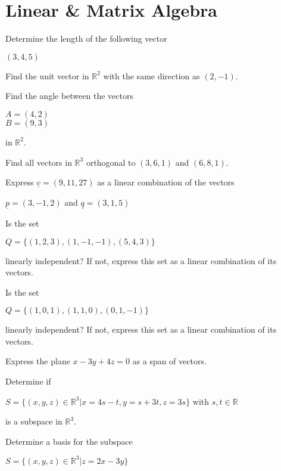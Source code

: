 \documentclass[12pt]{exam}
\begin{document}
\section{Linear \& Matrix Algebra}

\begin{questions}

\question Determine the length of the following vector

\begin{center}
    $(3,4,5)$
\end{center}

\question Find the unit vector in $\mathbb{R}^{2}$ with the same direction as $(2,-1)$.

\question Find the angle between the vectors
\begin{center}
    $A = (4,2)$ \\ $B = (9,3)$
\end{center}

in $\mathbb{R}^{2}$.

\question Find all vectors in $\mathbb{R}^{3}$ orthogonal to $(3,6,1)$ and $(6,8,1)$.

\question Express $\underline{v} = (9,11,27)$ as a linear combination of the vectors

\begin{center}
    $\underline{p} = (3,-1,2)$ and $\underline{q} = (3,1,5)$
\end{center}

\question Is the set
\begin{center}
$ Q = \{(1,2,3),(1,-1,-1),(5,4,3)\}$
\end{center}
 linearly independent? If not, express this set as a linear combination of its vectors.
 
\question Is the set
\begin{center}
$ Q = \{(1,0,1),(1,1,0),(0,1,-1)\}$
\end{center}
 linearly independent? If not, express this set as a linear combination of its vectors.
 
\question Express the plane $x - 3y + 4z = 0$ as a span of vectors.
 
\question Determine if
\begin{center}
$S = \{(x,y,z) \in \mathbb{R}^{3} | x = 4s - t, y = s + 3t, z = 3s\}$ with $s,t \in \mathbb{R}$
\end{center}
is a subspace in $\mathbb{R}^{3}$.
 
\question Determine a basis for the subspace
\begin{center}
$S = \{(x,y,z) \in \mathbb{R}^{3} | z = 2x -3y\}$
\end{center}


\end{questions}
\end{document}
